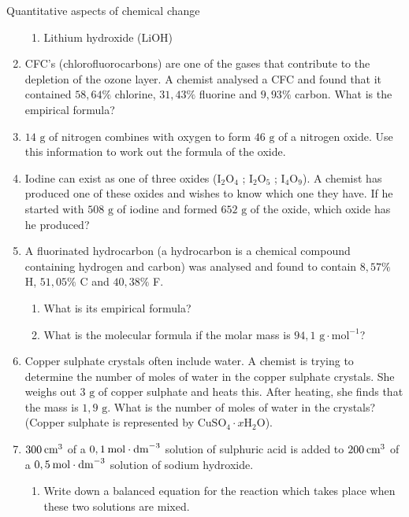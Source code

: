 \begin{eocexercises}{Quantitative aspects of chemical change}
\begin{enumerate}[noitemsep, label=\textbf{\arabic*}. ]
\begin{enumerate}[noitemsep, label=\textbf{\alph*}. ]
 \item Lithium hydroxide ($\text{LiOH}$)
 \end{enumerate}
\item CFC's (chlorofluorocarbons) are one of the gases that contribute to the depletion of the ozone layer. A chemist analysed a CFC and found that it contained $58,64\%$ chlorine, $31,43\%$ fluorine and $9,93\%$ carbon. What is the empirical formula?
\item $14 \text{ g}$ of nitrogen combines with oxygen to form $46 \text{ g}$ of a nitrogen oxide. Use this information to work out the formula of the oxide.
\item Iodine can exist as one of three oxides (${\text{I}}_{2}{\text{O}}_{4}$ ; ${\text{I}}_{2}{\text{O}}_{5}$ ; ${\text{I}}_{4}{\text{O}}_{9}$). A chemist has produced one of these oxides and wishes to know which one they have. If he started with $508 \text{ g}$ of iodine and formed $652 \text{ g}$ of the oxide, which oxide has he produced?
\item A fluorinated hydrocarbon (a hydrocarbon is a chemical compound containing hydrogen and carbon) was analysed and found to contain $8,57\%$ H, $51,05\%$ C and $40,38\%$ F.
 \begin{enumerate}[noitemsep, label=\textbf{\alph*}. ] 
 \item What is its empirical formula?
 \item What is the molecular formula if the molar mass is $94,1\text{ g}\cdot {\text{mol}}^{-1}$?
 \end{enumerate}
\item Copper sulphate crystals often include water. A chemist is trying to determine the number of moles of water in the copper sulphate crystals. She weighs out $3 \text{ g}$ of copper sulphate and heats this. After heating, she finds that the mass is $1,9 \text{ g}$. What is the number of moles of water in the crystals? (Copper sulphate is represented by ${\text{CuSO}}_{4}\cdot x{\text{H}}_{2}\text{O}$).        
\item $300\phantom{\rule{2pt}{0ex}}{\text{cm}}^{3}$ of a $0,1\phantom{\rule{2pt}{0ex}}\text{mol}\ensuremath{\cdot}{\text{dm}}^{-3}$ solution of sulphuric acid is added to $200\phantom{\rule{2pt}{0ex}}{\text{cm}}^{3}$ of a $0,5\phantom{\rule{2pt}{0ex}}\text{mol}\ensuremath{\cdot}{\text{dm}}^{-3}$ solution of sodium hydroxide.
 \begin{enumerate}[noitemsep, label=\textbf{\alph*}. ] 
 \item Write down a balanced equation for the reaction which takes place when these two solutions are mixed.

\end{enumerate}
\end{enumerate}
\end{eocexercises}
